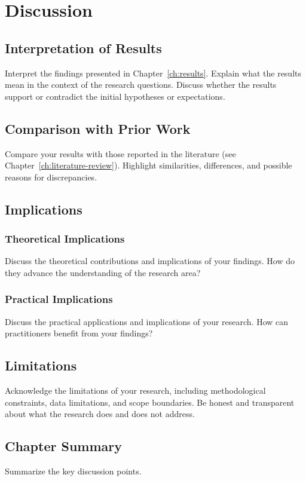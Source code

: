 \chapter{Discussion}
\label{ch:discussion}

\section{Interpretation of Results}
\label{sec:interpretation}

Interpret the findings presented in Chapter~\ref{ch:results}. Explain what the
results mean in the context of the research questions. Discuss whether the
results support or contradict the initial hypotheses or expectations.

\section{Comparison with Prior Work}
\label{sec:comparison}

Compare your results with those reported in the literature (see
Chapter~\ref{ch:literature-review}). Highlight similarities, differences,
and possible reasons for discrepancies.

\section{Implications}
\label{sec:implications}

\subsection{Theoretical Implications}
\label{sec:theo-implications}

Discuss the theoretical contributions and implications of your findings.
How do they advance the understanding of the research area?

\subsection{Practical Implications}
\label{sec:prac-implications}

Discuss the practical applications and implications of your research.
How can practitioners benefit from your findings?

\section{Limitations}
\label{sec:limitations}

Acknowledge the limitations of your research, including methodological
constraints, data limitations, and scope boundaries. Be honest and
transparent about what the research does and does not address.

\section{Chapter Summary}
\label{sec:disc-summary}

Summarize the key discussion points.
